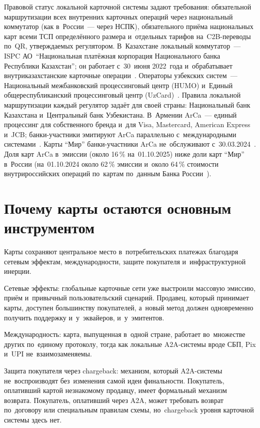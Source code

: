 Правовой статус локальной карточной системы задают требования:
обязательной маршрутизации всех внутренних карточных операций через
национальный коммутатор (как в~России~--- через НСПК), обязательного приёма
национальных карт всеми ТСП определённого размера и~отдельных тарифов
на~C2B-переводы по~QR, утверждаемых регулятором. В~Казахстане локальный
коммутатор~--- ISPC АО~\enquote{Национальная платёжная корпорация Национального
банка Республики Казахстан}; он работает с~30~июня 2022~года и~обрабатывает
внутриказахстанские карточные операции~\cite{nbk-ispc-launch-2022}.
Операторы узбекских систем~--- Национальный межбанковский процессинговый центр
(HUMO) и~Единый общереспубликанский процессинговый центр
(UzCard)~\cite{humo-faq,uzcard-about}. Правила локальной маршрутизации каждый
регулятор задаёт для своей страны: Национальный банк Казахстана
и~Центральный банк Узбекистана. В~Армении
ArCa~--- единый процессинг для собственного бренда и~для Visa, Mastercard,
American Express и~JCB; банки-участники эмитируют ArCa
параллельно с~международными системами~\cite{arca-about}. Карты \enquote{Мир}
банки-участники ArCa не~обслуживают с~30.03.2024~\cite{nspk-arca-mir-2024}.
Доля карт ArCa
в~эмиссии (около 16\,\% на~01.10.2025) ниже доли карт \enquote{Мир}
в~России (на~01.10.2024 около 62\,\% эмиссии и~около 64\,\% стоимости
  внутрироссийских операций по~картам по~данным Банка
России~\cite{cbr-onrnps-2025}).

\section{Почему карты остаются основным инструментом}\label{sec:card-dominance}

Карты сохраняют центральное место в~потребительских платежах благодаря сетевым
эффектам, международности, защите покупателя и~инфраструктурной инерции.

Сетевые эффекты: глобальные карточные сети уже выстроили массовую эмиссию,
приём и~привычный пользовательский сценарий. Продавец, который принимает карты,
доступен большинству покупателей, а~новый метод должен одновременно получить
поддержку и~у~эквайеров, и~у~эмитентов.

Международность: карта, выпущенная в~одной стране, работает во~множестве других
по~единому протоколу, тогда как локальные A2A-системы вроде СБП, Pix и~UPI
не~взаимозаменяемы.

Защита покупателя через chargeback: механизм, который A2A-системы
не~воспроизводят без~изменения самой идеи финальности. Покупатель, оплативший
картой незнакомому продавцу, имеет формальный механизм возврата. Покупатель,
оплативший через A2A, может требовать возврат по~договору или специальным
правилам схемы, но~chargeback уровня карточной системы здесь нет.

